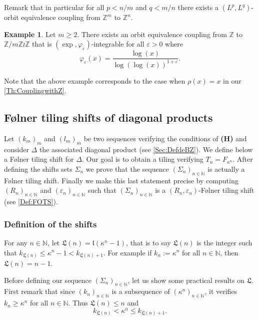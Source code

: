 \documentclass[english, 11pt, a4paper]{article}
\theoremstyle{definition}
\newtheorem{Ex}[Def]{Example}
\numberwithin{equation}{section}
\newcommand{\bN}{\mathbb{N}}
\newcommand{\bZ}{\mathbb{Z}}
\newcommand{\BZ}{\Delta}
\newcommand{\landing}{\mathfrak{l}}
\newcommand{\Landing}{\mathfrak{L}}
\begin{document}
Remark that in particular
for all $p<n/m$ and $q<m/n$ there exists a $(L^p,L^{q})$-orbit equivalence
coupling from $\bZ^m$ to $\bZ^n$.

\begin{Ex}\label{Ex:LamplighterZ}
 Let $m\geq 2$. There exists an orbit equivalence coupling from $\bZ$ to
 $\bZ/m\bZ\wr \bZ$ that is $(\exp, \varphi_{\varepsilon})$-integrable for all
 $\varepsilon>0$ where
 \begin{equation*}
   \varphi_{\varepsilon}(x)=\frac{\log(x)}{\log(\log(x))^{1+\varepsilon}}.
 \end{equation*}
\end{Ex}
Note that the above example corresponds to the case when $\rho(x)=x$ in our
\cref{Th:CouplingwithZ}.

\subsection{Følner tiling shifts of diagonal products}\label{subsec:FOTSDelta}
Let $(k_m)_m$ and $(l_m)_m$ be two sequences verifying the conditions of
\textbf{(H)} and consider $\BZ$ the associated diagonal product (see
\cref{Sec:DefdeBZ}). We define below a Følner tiling shift for $\BZ$. Our goal
is to obtain a tiling verifying $T_n=F_{\kappa^n}$. After defining the shifts sets
$\Sigma_n$ we prove that the sequence $(\Sigma_n)_{n\in \bN}$ is actually a Følner
tiling shift. Finally we make this last statement precise by
computing $(R_n)_{n\in \bN}$ and $(\varepsilon_n)_{n\in \bN}$ such that 
$(\Sigma_n)_{n\in \bN}$ is a
$(R_n,\varepsilon_n)$-Følner tiling shift (see \cref{Def:FOTS}). 

\subsubsection{Definition of the shifts}\label{subsec:DefDesShifts}
For any $n\in \bN$, let $\Landing(n)=\landing(\kappa^n-1)$, that is to say $\Landing(n)$ is the
integer such that $k_{\Landing(n)}\leq {\kappa}^{n}-1 <k_{\Landing(n)+1}$. For
example if $k_n:=\kappa^n$ for all $n\in \bN$, then $\Landing(n)=n-1$.

Before defining our sequence $(\Sigma_n)_{n\in \bN}$, let us show some
practical results on $\Landing$. First remark that
since $(k_n)_{n\in \bN}$ is a subsequence of $(\kappa^n)_{n\in \bN}$, it
verifies $k_n\geq \kappa^n$ for all $n\in \bN$. Thus $\Landing(n)\leq n$ and
\begin{equation*}
  k_{\Landing (n)} < \kappa^n \leq k_{\Landing(n)+1}.
\end{equation*}
\end{document}
